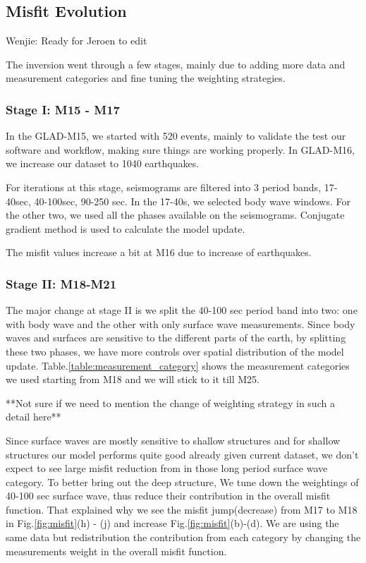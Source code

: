 \documentclass[extra,mreferee]{gji}
\begin{document}
\subsection{Misfit Evolution}

{\color{Red} Wenjie: Ready for Jeroen to edit}

The inversion went through a few stages, mainly due to adding more data
and measurement categories and fine tuning the weighting strategies.

\subsubsection{Stage I: M15 - M17}

In the GLAD-M15, we started with 520 events, mainly to validate the test our
software and workflow, making sure things are working properly.
In GLAD-M16, we increase our dataset to 1040 earthquakes.

For iterations at this stage, seismograms are filtered into 3 period bands,
17-40sec, 40-100sec, 90-250 sec. In the 17-40s, we selected body wave windows. For the
other two, we used all the phases available on the seismograms. Conjugate
gradient method is used to calculate the model update.

The misfit values increase a bit at M16 due to increase of earthquakes.

\subsubsection{Stage II: M18-M21}

The major change at stage II is we split the 40-100 sec period band into two: one with
body wave and the other with only surface wave measurements. Since body waves and
surfaces are sensitive to the different parts of the earth, by splitting these two
phases, we have more controls over spatial distribution of the model update.
Table.\ref{table:measurement_category} shows the measurement categories we used starting
from M18 and we will stick to it till M25.

**Not sure if we need to mention the change of weighting strategy in such a detail here**

Since surface waves are mostly sensitive to shallow
structures and for shallow structures our model performs quite good
already given current dataset, we don't expect to see large misfit
reduction from in those long period surface wave category.
To better bring out the deep structure, We tune
down the weightings of 40-100 sec surface wave, thus reduce their
contribution in the overall misfit function. That explained why we see the
misfit jump(decrease) from M17 to M18 in Fig.\ref{fig:misfit}(h) - (j) and
increase Fig.\ref{fig:misfit}(b)-(d). We are using the same data but
redistribution the contribution from each category by changing the measurements
weight in the overall misfit function.
\end{document}
